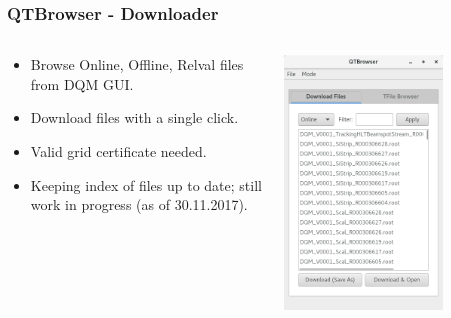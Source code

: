 \documentclass{beamer}
\begin{document}
\begin{frame}
\frametitle{QTBrowser - Downloader}
  \begin{columns}[T]
    \begin{column}{.5\textwidth}
     \begin{block}{}
     \begin{itemize}
     \item Browse Online, Offline, Relval files from DQM GUI.
     \item Download files with a single click.
     \item Valid grid certificate needed.
     \item Keeping index of files up to date; still work in progress (as of 30.11.2017).
     \end{itemize}
   	\end{block}	
    \end{column}
    \begin{column}{.5\textwidth}
    \begin{block}{}
    \includegraphics[width=0.7\textwidth]{figures/downloader.png}
    \end{block}
    \end{column}
  \end{columns}
\end{frame}
\end{document}
